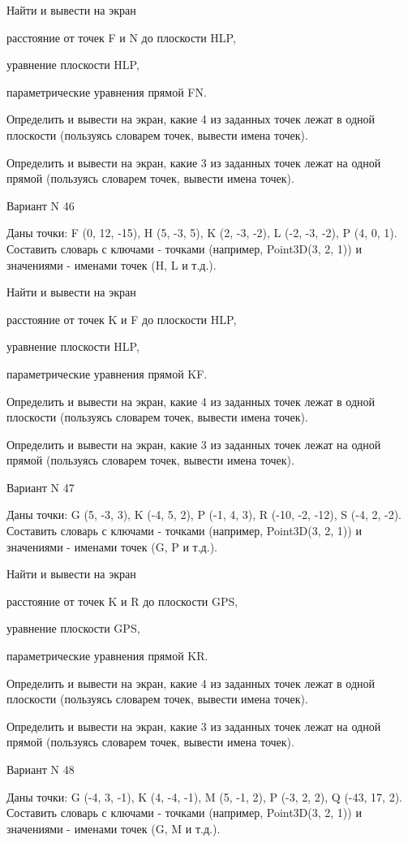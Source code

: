 \documentclass[11pt]{report}
\begin{document}
 
Найти и вывести на экран


расстояние от точек F и N до плоскости HLP,

 
уравнение плоскости HLP,

 
параметрические уравнения прямой FN.


Определить и вывести на экран, какие 4 из заданных точек лежат в одной плоскости (пользуясь словарем точек, вывести имена точек).


Определить и вывести на экран, какие 3 из заданных точек лежат на одной прямой (пользуясь словарем точек, вывести имена точек).

Вариант N 46

Даны точки: F (0, 12, -15), H (5, -3, 5), K (2, -3, -2), L (-2, -3, -2), P (4, 0, 1).
Составить словарь с ключами - точками (например, Point3D(3, 2, 1)) и значениями - именами точек (H, L и т.д.).

 
Найти и вывести на экран


расстояние от точек K и F до плоскости HLP,

 
уравнение плоскости HLP,

 
параметрические уравнения прямой KF.


Определить и вывести на экран, какие 4 из заданных точек лежат в одной плоскости (пользуясь словарем точек, вывести имена точек).


Определить и вывести на экран, какие 3 из заданных точек лежат на одной прямой (пользуясь словарем точек, вывести имена точек).

Вариант N 47

Даны точки: G (5, -3, 3), K (-4, 5, 2), P (-1, 4, 3), R (-10, -2, -12), S (-4, 2, -2).
Составить словарь с ключами - точками (например, Point3D(3, 2, 1)) и значениями - именами точек (G, P и т.д.).

 
Найти и вывести на экран


расстояние от точек K и R до плоскости GPS,

 
уравнение плоскости GPS,

 
параметрические уравнения прямой KR.


Определить и вывести на экран, какие 4 из заданных точек лежат в одной плоскости (пользуясь словарем точек, вывести имена точек).


Определить и вывести на экран, какие 3 из заданных точек лежат на одной прямой (пользуясь словарем точек, вывести имена точек).

Вариант N 48

Даны точки: G (-4, 3, -1), K (4, -4, -1), M (5, -1, 2), P (-3, 2, 2), Q (-43, 17, 2).
Составить словарь с ключами - точками (например, Point3D(3, 2, 1)) и значениями - именами точек (G, M и т.д.).
\end{document}
